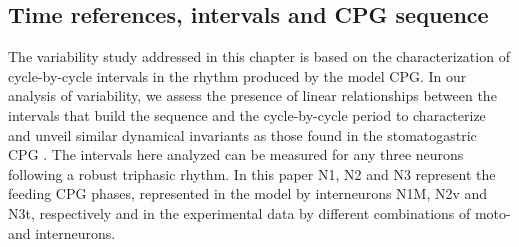 
\subsection{Time references, intervals and CPG sequence}
\label{subsec:intervals}
The variability study addressed in this chapter is based on the characterization of cycle-by-cycle intervals in the rhythm produced by the model CPG.
In our analysis of variability, we assess the presence of linear relationships between the intervals that build the sequence and the cycle-by-cycle period to characterize and unveil similar dynamical invariants as those found in the stomatogastric CPG \cite{elices_robust_2019}. 
The intervals here analyzed can be measured for any three neurons following a robust triphasic rhythm. In this paper N1, N2 and N3 represent the feeding CPG phases, represented in the model by interneurons N1M, N2v and N3t, respectively and in the experimental data by different combinations of moto- and interneurons.

